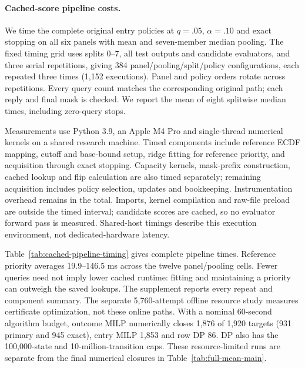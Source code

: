 \paragraph{Cached-score pipeline costs.}
\label{app:cached-timing}
We time the complete original entry policies at $q=.05$, $\alpha=.10$ and exact stopping on all six panels with mean and seven-member median pooling. The fixed timing grid uses splits 0--7, all test outputs and candidate evaluators, and three serial repetitions, giving 384 panel/pooling/split/policy configurations, each repeated three times (1,152 executions). Panel and policy orders rotate across repetitions. Every query count matches the corresponding original path; each reply and final mask is checked. We report the mean of eight splitwise median times, including zero-query stops.

Measurements use Python 3.9, an Apple M4 Pro and single-thread numerical kernels on a shared research machine. Timed components include reference ECDF mapping, cutoff and base-bound setup, ridge fitting for reference priority, and acquisition through exact stopping. Capacity kernels, mask-prefix construction, cached lookup and flip calculation are also timed separately; remaining acquisition includes policy selection, updates and bookkeeping. Instrumentation overhead remains in the total. Imports, kernel compilation and raw-file preload are outside the timed interval; candidate scores are cached, so no evaluator forward pass is measured. Shared-host timings describe this execution environment, not dedicated-hardware latency.

Table~\ref{tab:cached-pipeline-timing} gives complete pipeline times. Reference priority averages 19.9--146.5 ms across the twelve panel/pooling cells. Fewer queries need not imply lower cached runtime: fitting and maintaining a priority can outweigh the saved lookups. The supplement reports every repeat and component summary. The separate 5,760-attempt offline resource study measures certificate optimization, not these online paths. With a nominal 60-second algorithm budget, outcome MILP numerically closes 1,876 of 1,920 targets (931 primary and 945 exact), entry MILP 1,853 and row DP 86. DP also has the 100,000-state and 10-million-transition caps. These resource-limited runs are separate from the final numerical closures in Table~\ref{tab:full-mean-main}.


